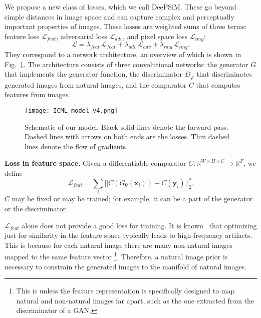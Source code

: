 \documentclass{article}
\newcommand{\TODO}[1]{{\color{dblue}[TODO #1]}}
\newcommand{\oR}{\mathbb{R}}
\newcommand{\inp}{\mathbf{x}}
\newcommand{\targ}{\mathbf{y}}
\newcommand{\weights}{\mathbf{\theta}}
\newcommand{\gen}{G_\weights}
\newcommand{\comp}{C}
\newcommand{\discr}{D_\varphi}
\newcommand{\loss}{\mathcal{L}}
\newcommand{\featloss}{\loss_{feat}}
\newcommand{\discrloss}{\loss_{adv}}
\newcommand{\pixloss}{\loss_{img}}
\newcommand{\imgspace}{\oR^{W \times H \times C}}
\newcommand{\featspace}{\oR^F}
\begin{document}
We propose a new class of losses, which we call DeePSiM.
These go beyond simple distances in image space and can capture complex and perceptually important properties of images.
These losses are weighted sums of three terms: feature loss $\featloss$, adversarial loss $\discrloss$, and pixel space loss $\pixloss$:
\begin{equation}
 \loss = \lambda_{feat}\, \featloss  + \lambda_{adv}\, \discrloss + \lambda_{img}\, \pixloss.
\end{equation}
They correspond to a network architecture, an overview of which is shown in Fig.~\ref{fig:model}. The architecture consists of three convolutional networks: the generator $G$ that implements the generator function, the discriminator $\discr$ that discriminates generated images from natural images, and the comparator $C$ that computes features from images.     

\begin{figure}
\begin{center}
\texttt{[image: ICML\_model\_v4.png]}
   \caption{Schematic of our model. Black solid lines denote the forward pass. 
   Dashed lines with arrows on both ends are the losses. 
   Thin dashed lines denote the flow of gradients.}
   \label{fig:model}
\end{center}
\end{figure}

\textbf{Loss in feature space.} 
Given a differentiable comparator $\comp \colon \imgspace \to \featspace$, we define
\begin{equation}
 \featloss = \sum\limits_{i} || \comp(\gen(\inp_i)) - \comp(\targ_i) ||_2^2.
\end{equation}
$\comp$ may be fixed or may be trained; for example, it can be a part of the generator or the discriminator.

$\featloss$ alone does not provide a good loss for training.
It is known~\citep{Mahendran_CVPR2015} that optimizing just for similarity in the feature space typically leads to high-frequency artifacts.
This is because 
for each natural image there are many non-natural images mapped to the same feature vector
\footnote{This is unless the feature representation is specifically designed to map natural and non-natural images far apart, such as the one extracted from the discriminator of a GAN.}.
Therefore, a natural image prior is necessary to constrain the generated images to the manifold of natural images.
\end{document}

